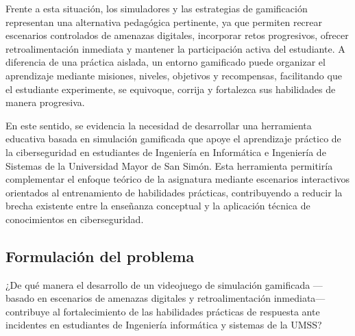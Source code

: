 Frente a esta situación, los simuladores y las estrategias de gamificación representan una alternativa pedagógica pertinente, ya que permiten recrear escenarios controlados de amenazas digitales, incorporar retos progresivos, ofrecer retroalimentación inmediata y mantener la participación activa del estudiante. A diferencia de una práctica aislada, un entorno gamificado puede organizar el aprendizaje mediante misiones, niveles, objetivos y recompensas, facilitando que el estudiante experimente, se equivoque, corrija y fortalezca sus habilidades de manera progresiva.

En este sentido, se evidencia la necesidad de desarrollar una herramienta educativa basada en simulación gamificada que apoye el aprendizaje práctico de la ciberseguridad en estudiantes de Ingeniería en Informática e Ingeniería de Sistemas de la Universidad Mayor de San Simón. Esta herramienta permitiría complementar el enfoque teórico de la asignatura mediante escenarios interactivos orientados al entrenamiento de habilidades prácticas, contribuyendo a reducir la brecha existente entre la enseñanza conceptual y la aplicación técnica de conocimientos en ciberseguridad.

\subsection*{Formulación del problema}

\noindent ¿De qué manera el desarrollo de un videojuego de simulación gamificada —basado en
escenarios de amenazas digitales y retroalimentación inmediata— contribuye al fortalecimiento
de las habilidades prácticas de respuesta ante incidentes en estudiantes de Ingeniería
informática y sistemas de la UMSS?